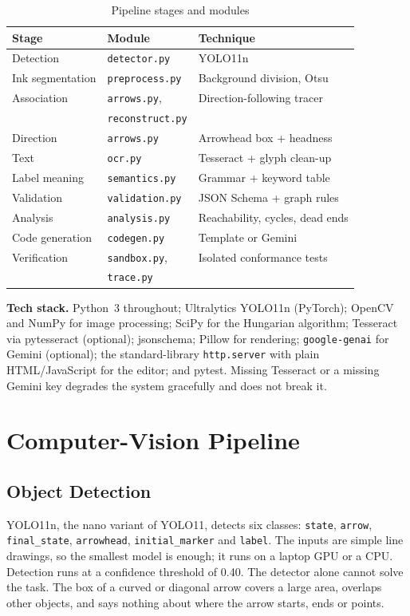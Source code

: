 \documentclass[journal,10pt]{IEEEtran}
\newcommand{\code}[1]{\texttt{#1}}
\begin{document}
\begin{table}[t]
\centering
\caption{Pipeline stages and modules}
\label{tab:modules}
\footnotesize
\begin{tabular}{@{}lll@{}}
\toprule
\textbf{Stage} & \textbf{Module} & \textbf{Technique} \\
\midrule
Detection & \code{detector.py} & YOLO11n \\
Ink segmentation & \code{preprocess.py} & Background division, Otsu \\
Association & \code{arrows.py}, & Direction-following tracer \\
 & \code{reconstruct.py} & \\
Direction & \code{arrows.py} & Arrowhead box + headness \\
Text & \code{ocr.py} & Tesseract + glyph clean-up \\
Label meaning & \code{semantics.py} & Grammar + keyword table \\
Validation & \code{validation.py} & JSON Schema + graph rules \\
Analysis & \code{analysis.py} & Reachability, cycles, dead ends \\
Code generation & \code{codegen.py} & Template or Gemini \\
Verification & \code{sandbox.py}, & Isolated conformance tests \\
 & \code{trace.py} & \\
\bottomrule
\end{tabular}
\end{table}

\textbf{Tech stack.} Python~3 throughout; Ultralytics YOLO11n (PyTorch); OpenCV and NumPy
for image processing; SciPy for the Hungarian algorithm; Tesseract via pytesseract
(optional); jsonschema; Pillow for rendering; \code{google-genai} for Gemini (optional);
the standard-library \code{http.server} with plain HTML/JavaScript for the editor; and
pytest. Missing Tesseract or a missing Gemini key degrades the system gracefully and does
not break it.

\section{Computer-Vision Pipeline}
\label{sec:cv}

\subsection{Object Detection}
YOLO11n, the nano variant of YOLO11, detects six classes: \code{state}, \code{arrow},
\code{final\_state}, \code{arrowhead}, \code{initial\_marker} and \code{label}. The inputs
are simple line drawings, so the smallest model is enough; it runs on a laptop GPU or a
CPU. Detection runs at a confidence threshold of 0.40. The detector alone cannot solve the
task. The box of a curved or diagonal arrow covers a large area, overlaps other objects,
and says nothing about where the arrow starts, ends or points.
\end{document}
